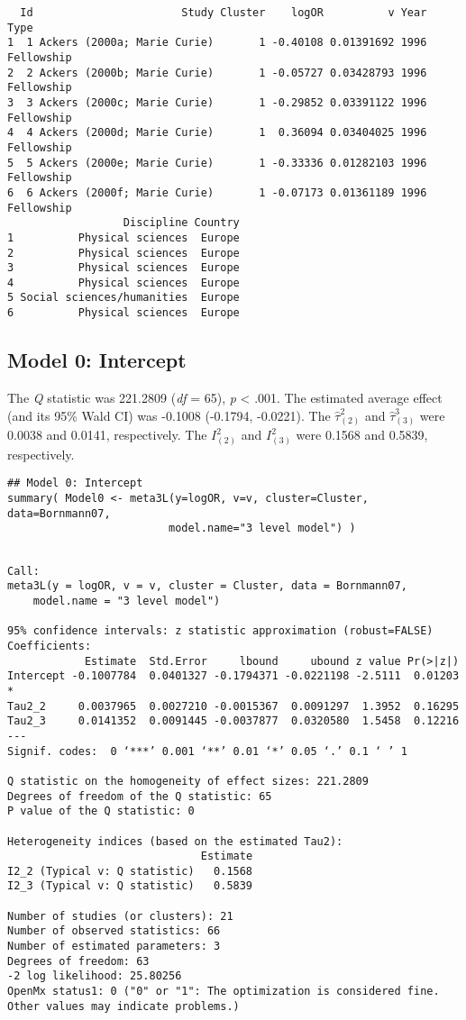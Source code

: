 \documentclass[11pt]{article}
\begin{document}
\begin{verbatim}
  Id                       Study Cluster    logOR          v Year       Type
1  1 Ackers (2000a; Marie Curie)       1 -0.40108 0.01391692 1996 Fellowship
2  2 Ackers (2000b; Marie Curie)       1 -0.05727 0.03428793 1996 Fellowship
3  3 Ackers (2000c; Marie Curie)       1 -0.29852 0.03391122 1996 Fellowship
4  4 Ackers (2000d; Marie Curie)       1  0.36094 0.03404025 1996 Fellowship
5  5 Ackers (2000e; Marie Curie)       1 -0.33336 0.01282103 1996 Fellowship
6  6 Ackers (2000f; Marie Curie)       1 -0.07173 0.01361189 1996 Fellowship
                  Discipline Country
1          Physical sciences  Europe
2          Physical sciences  Europe
3          Physical sciences  Europe
4          Physical sciences  Europe
5 Social sciences/humanities  Europe
6          Physical sciences  Europe
\end{verbatim}

\subsection{Model 0: Intercept}
\label{sec:orgee0804c}
The \emph{Q} statistic was 221.2809 (\emph{df} = 65), \emph{p} < .001. The estimated average effect (and its 95\% Wald CI) was -0.1008 (-0.1794, -0.0221). The \(\hat{\tau}^2_{(2)}\) and \(\hat{\tau}^3_{(3)}\) were 0.0038 and 0.0141, respectively. The \(I^2_{(2)}\) and \(I^2_{(3)}\) were 0.1568 and 0.5839, respectively. 

\begin{verbatim}
## Model 0: Intercept  
summary( Model0 <- meta3L(y=logOR, v=v, cluster=Cluster, data=Bornmann07, 
                         model.name="3 level model") )
\end{verbatim}

\begin{verbatim}

Call:
meta3L(y = logOR, v = v, cluster = Cluster, data = Bornmann07, 
    model.name = "3 level model")

95% confidence intervals: z statistic approximation (robust=FALSE)
Coefficients:
            Estimate  Std.Error     lbound     ubound z value Pr(>|z|)  
Intercept -0.1007784  0.0401327 -0.1794371 -0.0221198 -2.5111  0.01203 *
Tau2_2     0.0037965  0.0027210 -0.0015367  0.0091297  1.3952  0.16295  
Tau2_3     0.0141352  0.0091445 -0.0037877  0.0320580  1.5458  0.12216  
---
Signif. codes:  0 ‘***’ 0.001 ‘**’ 0.01 ‘*’ 0.05 ‘.’ 0.1 ‘ ’ 1

Q statistic on the homogeneity of effect sizes: 221.2809
Degrees of freedom of the Q statistic: 65
P value of the Q statistic: 0

Heterogeneity indices (based on the estimated Tau2):
                              Estimate
I2_2 (Typical v: Q statistic)   0.1568
I2_3 (Typical v: Q statistic)   0.5839

Number of studies (or clusters): 21
Number of observed statistics: 66
Number of estimated parameters: 3
Degrees of freedom: 63
-2 log likelihood: 25.80256 
OpenMx status1: 0 ("0" or "1": The optimization is considered fine.
Other values may indicate problems.)
\end{verbatim}
\end{document}
